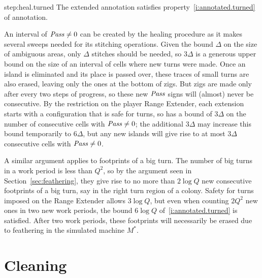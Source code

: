 \documentclass[11pt]{memoir}
\theoremstyle{definition} %
\newcommand{\fld}[1]{\ensuremath{\textit{#1\/}}}
\newcommand{\Q}{Q} %
\newcommand{\Pass}{\fld{Pass}} %
\begin{document}
\begin{Proof}
\begin{step+}{step:heal.turned}
  The extended annotation satisfies property~\eqref{i:annotated.turned} of annotation.
\end{step+}
\begin{pproof}
  An interval of \( \Pass\ne 0 \) can be created by the healing procedure as it makes several sweeps
  needed for its stitching operations.
  Given the bound \( \Delta \) on the size of ambiguous areas, only \( \Delta \) stitches should be needed,
  so \( 3\Delta \) is a generous upper bound on the size of an interval of cells where new turns were made.
  Once an island is eliminated and its place is passed over, these traces of small turns are also erased,
  leaving only the ones at the bottom of zigs.
  But zigs are made only after every two steps of progress,
  so these new \( \Pass \) signs will (almost) never be consecutive.
  By the restriction on the player Range Extender, each extension starts with a configuration that
  is safe for turns, so has a
  bound of \( 3\Delta \) on the number of
  consecutive cells with \( \Pass\ne 0 \); the additional \( 3\Delta \) may increase this bound temporarily to
  \( 6\Delta \), but any new islands will give rise to at most \( 3\Delta \) consecutive cells with \( \Pass\ne 0 \).

  A similar argument applies to footprints of a big turn.
  The number of big turns in a work period is less than \( \Q^{2} \), so by the argument seen
  in Section~\ref{sec:feathering}, they give rise to no more than \( 2\log\Q \) new
  consecutive footprints of a big turn, say in the right turn region of a colony.
  Safety for turns imposed on the Range Extender allows \( 3\log\Q \),
  but even when counting \( 2\Q^{2} \) new ones in
  two new work periods, the bound \( 6\log\Q \) of~\eqref{i:annotated.turned} is satisfied.
  After two work periods, these footprints will necessarily be erased
  due to feathering in the simulated machine \( M^{*} \). 
\end{pproof} %
\end{Proof}


\section{Cleaning}\label{sec:cleaning}
\end{document}
